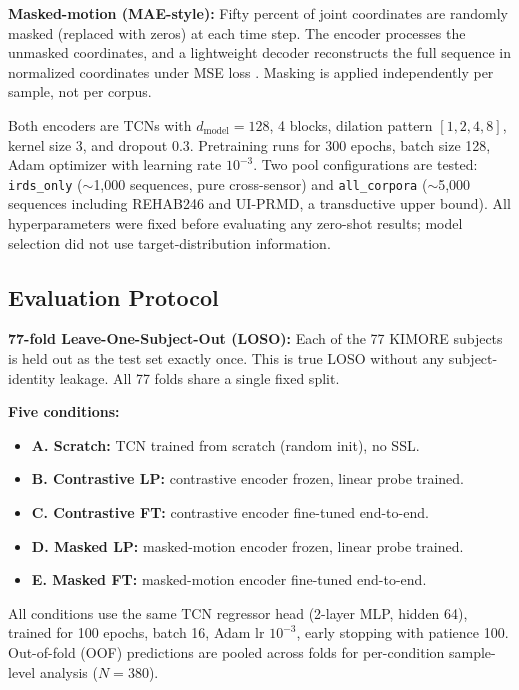\documentclass[10pt,journal]{IEEEtran}
\begin{document}
\textbf{Masked-motion (MAE-style):} Fifty percent of joint coordinates are randomly masked (replaced with zeros) at each time step. The encoder processes the unmasked coordinates, and a lightweight decoder reconstructs the full sequence in normalized coordinates under MSE loss \cite{he2022mae}. Masking is applied independently per sample, not per corpus.

Both encoders are TCNs with $d_{\text{model}} = 128$, 4 blocks, dilation pattern $[1,2,4,8]$, kernel size 3, and dropout 0.3. Pretraining runs for 300 epochs, batch size 128, Adam optimizer with learning rate $10^{-3}$. Two pool configurations are tested: \texttt{irds\_only} ($\sim$1,000 sequences, pure cross-sensor) and \texttt{all\_corpora} ($\sim$5,000 sequences including REHAB246 and UI-PRMD, a transductive upper bound). All hyperparameters were fixed before evaluating any zero-shot results; model selection did not use target-distribution information.

\subsection{Evaluation Protocol}
\label{sec:eval}

\textbf{77-fold Leave-One-Subject-Out (LOSO):} Each of the 77 KIMORE subjects is held out as the test set exactly once. This is true LOSO without any subject-identity leakage. All 77 folds share a single fixed split.

\textbf{Five conditions:}
\begin{itemize}
    \item \textbf{A. Scratch:} TCN trained from scratch (random init), no SSL.
    \item \textbf{B. Contrastive LP:} contrastive encoder frozen, linear probe trained.
    \item \textbf{C. Contrastive FT:} contrastive encoder fine-tuned end-to-end.
    \item \textbf{D. Masked LP:} masked-motion encoder frozen, linear probe trained.
    \item \textbf{E. Masked FT:} masked-motion encoder fine-tuned end-to-end.
\end{itemize}

All conditions use the same TCN regressor head (2-layer MLP, hidden 64), trained for 100 epochs, batch 16, Adam lr $10^{-3}$, early stopping with patience 100. Out-of-fold (OOF) predictions are pooled across folds for per-condition sample-level analysis ($N=380$).
\end{document}
